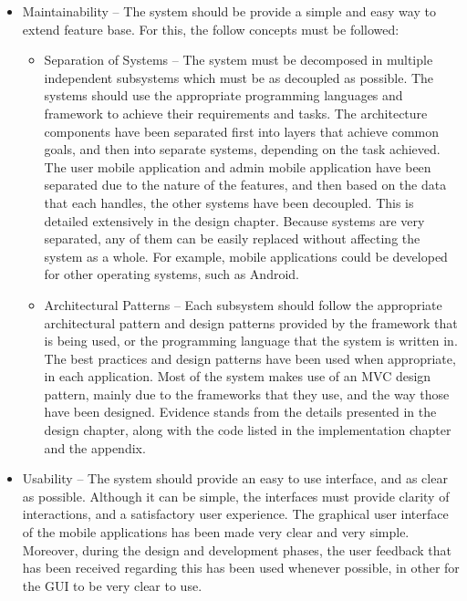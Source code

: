 \begin{itemize}
    \item Maintainability – The system should be provide a simple and easy way to extend feature base. For this, the follow concepts must be followed:
        \begin{itemize}
            \item Separation of Systems – The system must be decomposed in multiple independent subsystems which must be as decoupled as possible. The systems should use the appropriate programming languages and framework to achieve their requirements and tasks.
            \newline\newline
            The architecture components have been separated first into layers that achieve common goals, and then into separate systems, depending on the task achieved. The user mobile application and admin mobile application have been separated due to the nature of the features, and then based on the data that each handles, the other systems have been decoupled. This is detailed extensively in the design chapter. Because systems are very separated, any of them can be easily replaced without affecting the system as a whole. For example, mobile applications could be developed for other operating systems, such as Android.
            \item Architectural Patterns – Each subsystem should follow the appropriate architectural pattern and design patterns provided by the framework that is being used, or the programming language that the system is written in.
            \newline\newline
            The best practices and design patterns have been used when appropriate, in each application. Most of the system makes use of an MVC design pattern, mainly due to the frameworks that they use, and the way those have been designed. Evidence stands from the details presented in the design chapter, along with the code listed in the implementation chapter and the appendix.
        \end{itemize}
    \item Usability – The system should provide an easy to use interface, and as clear as possible. Although it can be simple, the interfaces must provide clarity of interactions, and a satisfactory user experience.
    \newline\newline
    The graphical user interface of the mobile applications has been made very clear and very simple. Moreover, during the design and development phases, the user feedback that has been received regarding this has been used whenever possible, in other for the GUI to be very clear to use.
\end{itemize}

